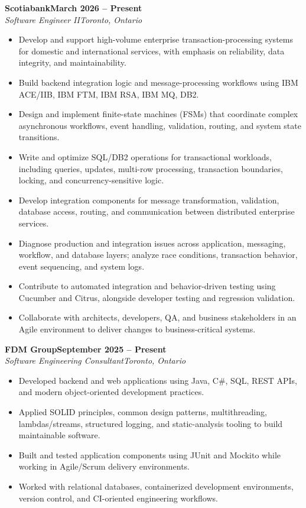\documentclass[10pt,letterpaper]{article}
\newcommand{\resumeEntry}[4]{
 \textbf{\color{heading}#1}\hfill \textbf{#2}\\[-1pt]
 \textit{#3}\hfill {\small\textit{#4}}\\[-3pt]
}
\begin{document}
\resumeEntry{Scotiabank}{March 2026 -- Present}{Software Engineer II}{Toronto, Ontario}
\begin{itemize}
 \item Develop and support high-volume enterprise transaction-processing systems for domestic and international services, with emphasis on reliability, data integrity, and maintainability.
 \item Build backend integration logic and message-processing workflows using IBM ACE/IIB, IBM FTM, IBM RSA, IBM MQ, DB2.
 \item Design and implement finite-state machines (FSMs) that coordinate complex asynchronous workflows, event handling, validation, routing, and system state transitions.
 \item Write and optimize SQL/DB2 operations for transactional workloads, including queries, updates, multi-row processing, transaction boundaries, locking, and concurrency-sensitive logic.
 \item Develop integration components for message transformation, validation, database access, routing, and communication between distributed enterprise services.
 \item Diagnose production and integration issues across application, messaging, workflow, and database layers; analyze race conditions, transaction behavior, event sequencing, and system logs.
 \item Contribute to automated integration and behavior-driven testing using Cucumber and Citrus, alongside developer testing and regression validation.
 \item Collaborate with architects, developers, QA, and business stakeholders in an Agile environment to deliver changes to business-critical systems.
\end{itemize}

\resumeEntry{FDM Group}{September 2025 -- Present}{Software Engineering Consultant}{Toronto, Ontario}
\begin{itemize}
 \item Developed backend and web applications using Java, C\#, SQL, REST APIs, and modern object-oriented development practices.
 \item Applied SOLID principles, common design patterns, multithreading, lambdas/streams, structured logging, and static-analysis tooling to build maintainable software.
 \item Built and tested application components using JUnit and Mockito while working in Agile/Scrum delivery environments.
 \item Worked with relational databases, containerized development environments, version control, and CI-oriented engineering workflows.
\end{itemize}
\end{document}
